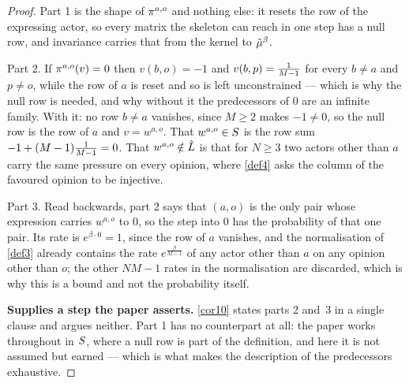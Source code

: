 \begin{proof}
  \leanok
  Part 1 is the shape of $\pi^{a,o}$ and nothing else: it resets the row of
  the expressing actor, so every matrix the skeleton can reach in one step has a
  null row, and invariance carries that from the kernel to $\tilde{\mu}^\beta$.

  Part 2.  If $\pi^{a,o}(v) = 0$ then $v(b,o) = -1$ and $v(b,p) =
  \tfrac{1}{M-1}$ for every $b \ne a$ and $p \ne o$, while the row of $a$ is reset
  and so is left unconstrained --- which is why the null row is needed, and why
  without it the predecessors of $0$ are an infinite family.  With it: no row
  $b \ne a$ vanishes, since $M \ge 2$ makes $-1 \ne 0$, so the null row is the
  row of $a$ and $v = w^{a,o}$.  That $w^{a,o} \in S$ is the row sum
  $-1 + (M-1)\tfrac{1}{M-1} = 0$.  That $w^{a,o} \notin \hat{L}$ is that for $N \ge 3$
  two actors other than $a$ carry the same pressure on every opinion, where
  \ref{def4} asks the column of the favoured opinion to be injective.

  Part 3.  Read backwards, part 2 says that $(a,o)$ is the only pair whose
  expression carries $w^{a,o}$ to $0$, so the step into $0$ has the probability
  of that one pair.  Its rate is $e^{\beta \cdot 0} = 1$, since the row of $a$
  vanishes, and the normalisation of \ref{def3} already contains the rate
  $e^{\frac{\beta}{M-1}}$ of any actor other than $a$ on any opinion other than
  $o$; the other $NM - 1$ rates in the normalisation are discarded, which is why
  this is a bound and not the probability itself.

  \textbf{Supplies a step the paper asserts.}  \ref{cor10} states parts 2
  and~3 in a single clause and argues neither.  Part 1 has no counterpart at
  all: the paper works throughout in $S$, where a null row is part of the
  definition, and here it is not assumed but earned --- which is what makes the
  description of the predecessors exhaustive.
\end{proof}

